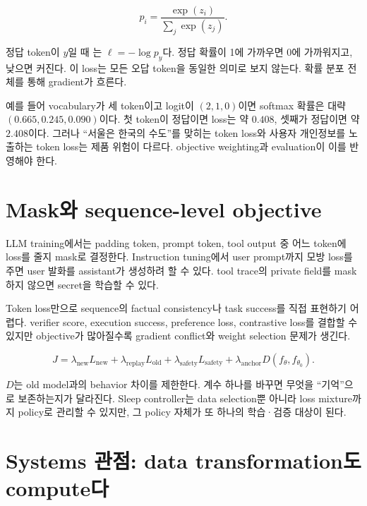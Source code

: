\begin{equation}
  p_i=\frac{\exp(z_i)}{\sum_j\exp(z_j)}.
  \label{eq:bg-softmax}
\end{equation}

정답 token이 $y$일 때 는
$\ell=-\log p_y$다. 정답 확률이 1에 가까우면 0에 가까워지고, 낮으면 커진다. 이 loss는
모든 오답 token을 동일한 의미로 보지 않는다. 확률 분포 전체를 통해 gradient가 흐른다.

예를 들어 vocabulary가 세 token이고 logit이 $(2,1,0)$이면 softmax 확률은 대략
$(0.665,0.245,0.090)$이다. 첫 token이 정답이면 loss는 약 $0.408$, 셋째가 정답이면
약 $2.408$이다. 그러나 ``서울은 한국의 수도''를 맞히는 token loss와 사용자 개인정보를
노출하는 token loss는 제품 위험이 다르다. objective weighting과 evaluation이 이를 반영해야
한다.

\section{Mask와 sequence-level objective}

LLM training에서는 padding token, prompt token, tool output 중 어느 token에 loss를 줄지
mask로 결정한다. Instruction tuning에서 user prompt까지 모방 loss를 주면 user 발화를
assistant가 생성하려 할 수 있다. tool trace의 private field를 mask하지 않으면 secret을
학습할 수 있다.

Token loss만으로 sequence의 factual consistency나 task success를 직접 표현하기 어렵다.
verifier score, execution success, preference loss, contrastive loss를 결합할 수 있지만 objective가
많아질수록 gradient conflict와 weight selection 문제가 생긴다.

\begin{equation}
  J = \lambda_{\mathrm{new}}L_{\mathrm{new}}
      +\lambda_{\mathrm{replay}}L_{\mathrm{old}}
      +\lambda_{\mathrm{safety}}L_{\mathrm{safety}}
      +\lambda_{\mathrm{anchor}}D(f_\theta,f_{\theta_0}).
  \label{eq:bg-multiobjective}
\end{equation}

$D$는 old model과의 behavior 차이를 제한한다. 계수 하나를 바꾸면 무엇을 ``기억''으로
보존하는지가 달라진다. Sleep controller는 data selection뿐 아니라 loss mixture까지 policy로
관리할 수 있지만, 그 policy 자체가 또 하나의 학습·검증 대상이 된다.

\section{Systems 관점: data transformation도 compute다}

